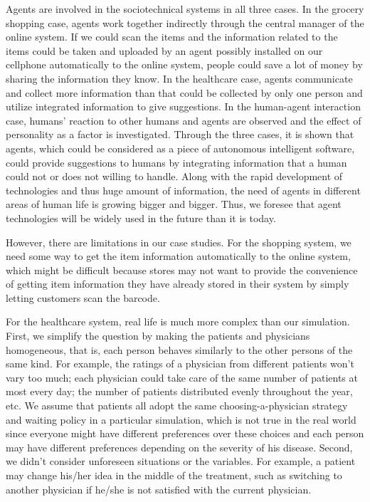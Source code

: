 Agents are involved in the sociotechnical systems in all three cases. In the grocery shopping case, agents work together indirectly through the central manager of the online system. If we could scan the items and the information related to the items could be taken and uploaded by an agent possibly installed on our cellphone automatically to the online system, people could save a lot of money by sharing the information they know. In the healthcare case, agents communicate and collect more information than that could be collected by only one person and utilize integrated information to give suggestions. In the human-agent interaction case, humans' reaction to other humans and agents are observed and the effect of personality as a factor is investigated. Through the three cases, it is shown that agents, which could be considered as a piece of autonomous intelligent software, could provide suggestions to humans by integrating information that a human could not or does not willing to handle. Along with the rapid development of technologies and thus huge amount of information, the need of agents in different areas of human life is growing bigger and bigger. Thus, we foresee that agent technologies will be widely used in the future than it is today.

However, there are limitations in our case studies. For the shopping system, we need some way to get the item information automatically to the online system, which might be difficult because stores may not want to provide the convenience of getting item information they have already stored in their system by simply letting customers scan the barcode.

For the healthcare system, real life is much more complex than our simulation. First, we simplify the question by making the patients and physicians homogeneous, that is, each person behaves similarly to the other persons of the same kind. For example, the ratings of a physician from different patients won't vary too much; each physician could take care of the same number of patients at most every day; the number of patients distributed evenly throughout the year, etc. We assume that patients all adopt the same choosing-a-physician strategy and waiting policy in a particular simulation, which is not true in the real world since everyone might have different preferences over these choices and each person may have different preferences depending on the severity of his disease. Second, we didn't consider unforeseen situations or the variables. For example, a patient may change his/her idea in the middle of the treatment, such as switching to another physician if he/she is not satisfied with the current physician.  

